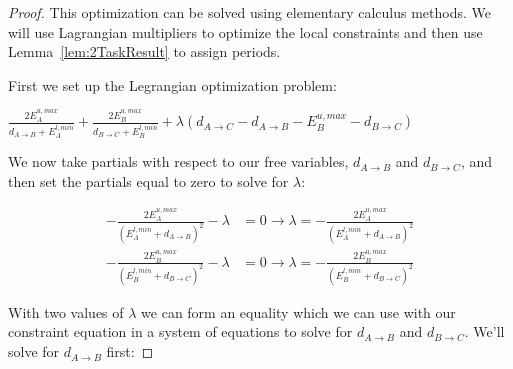 \begin{proof}
	This optimization can be solved using elementary calculus methods. We will use Lagrangian multipliers to optimize the local constraints and then use Lemma~\ref{lem:2TaskResult} to assign periods.
	
	First we set up the Legrangian optimization problem:
	\begin{center}
		$\frac{2E^{u,max}_A}{d_{A \to B}+E^{l,min}_A} + \frac{2E^{u,max}_B}{d_{B \to C}+E^{l,min}_B} + \lambda (d_{A \to C}-d_{A \to B}-E^{u,max}_B-d_{B \to C})$
	\end{center}
	
	We now take partials with respect to our free variables, $d_{A \to B}$ and $d_{B \to C}$, and then set the partials equal to zero to solve for $\lambda$:
	
	
	\begin{align*}
	-\frac{2 E^{u,max}_A}{(E^{l,min}_A+d_{A \to B})^2}-\lambda &= 0 \to \lambda = -\frac{2 E^{u,max}_A}{(E^{l,min}_A+d_{A \to B})^2}\\
	-\frac{2 E^{u,max}_B}{(E^{l,min}_B+d_{B \to C})^2}-\lambda &= 0 \to \lambda = -\frac{2 E^{u,max}_B}{(E^{l,min}_B+d_{B \to C})^2}
	\end{align*}
	
	With two values of $\lambda$ we can form an equality which we can use with our constraint equation in a system of equations to solve for $d_{A \to B}$ and $d_{B \to C}$. We'll solve for $d_{A \to B}$ first:
	
	
	

\end{proof}
